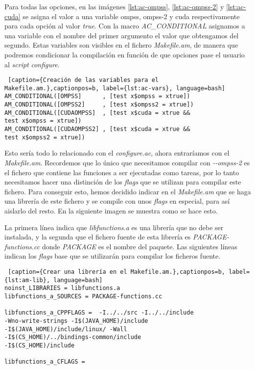 \bigskip

Para todas las opciones, en las imágenes \ref{lst:ac-ompss}, \ref{lst:ac-ompss-2} y \ref{lst:ac-cuda} se asigna el valor a una variable ompss, ompss-2 y cuda respectivamente para cada opción al valor \textit{true}. Con la macro \textit{AC\_CONDITIONAL} asignamos a una variable con el nombre del primer argumento el valor que obtengamos del segundo. Estas variables son visibles en el fichero \textit{Makefile.am}, de manera que podremos condicionar la compilación en función de que opciones pase el usuario al \textit{script} \textit{configure}.

\bigskip

\begin{minipage}{\linewidth}
\begin{lstlisting} [caption={Creación de las variables para el Makefile.am.},captionpos=b, label={lst:ac-vars}, language=bash]
AM_CONDITIONAL([OMPSS]      , [test x$ompss = xtrue])
AM_CONDITIONAL([OMPSS2]     , [test x$ompss2 = xtrue])
AM_CONDITIONAL([CUDAOMPSS]  , [test x$cuda = xtrue && 
test x$ompss = xtrue])
AM_CONDITIONAL([CUDAOMPSS2] , [test x$cuda = xtrue && 
test x$ompss2 = xtrue])
\end{lstlisting}
\end{minipage}

\bigskip

Esto sería todo lo relacionado con el \textit{configure.ac}, ahora entraríamos con el \textit{Makefile.am}. Recordemos que lo único que necesitamos compilar con \textit{-{}-ompss-2} es el fichero que contiene las funciones a ser ejecutadas como tareas, por lo tanto necesitamos hacer una distinción de los \textit{flags} que se utilizan para compilar este fichero. Para conseguir esto, hemos decidido indicar en el \textit{Makefile.am} que se haga una librería de este fichero y se compile con unos \textit{flags} en especial, para así aislarlo del resto. En la siguiente imagen se muestra como se hace esto.

\par\bigskip

La primera línea indica que \textit{libfunctions.a} es una librería que no debe ser instalada, y la segunda que el fichero fuente de esta librería es \textit{PACKAGE-functions.cc} donde \textit{PACKAGE} es el nombre del paquete. Las siguientes líneas indican los \textit{flags} base que se utilizarán para compilar los ficheros fuente.
 
\bigskip

\begin{minipage}{\linewidth}
\begin{lstlisting} [caption={Crear una librería en el Makefile.am.},captionpos=b, label={lst:am-lib}, language=bash]
noinst_LIBRARIES = libfunctions.a
libfunctions_a_SOURCES = PACKAGE-functions.cc

libfunctions_a_CPPFLAGS =  -I../../src -I../../include
-Wno-write-strings -I$(JAVA_HOME)/include 
-I$(JAVA_HOME)/include/linux/ -Wall
-I$(CS_HOME)/../bindings-common/include
-I$(CS_HOME)/include 

libfunctions_a_CFLAGS =
\end{lstlisting}
\end{minipage}

